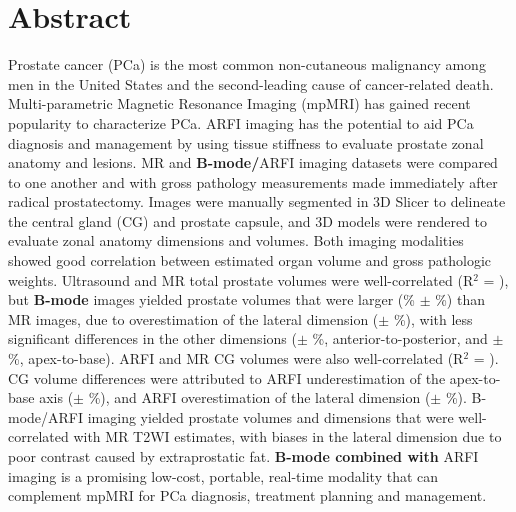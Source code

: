 \section*{Abstract}
Prostate cancer (PCa) is the most common non-cutaneous malignancy among men in
the United States and the second-leading cause of cancer-related death.
Multi-parametric Magnetic Resonance Imaging (mpMRI) has gained recent
popularity to characterize PCa.  ARFI imaging has the potential to aid PCa
diagnosis and management by using tissue stiffness to evaluate prostate zonal
anatomy and lesions.  MR and \textbf{B-mode/}ARFI \invivo imaging datasets were
compared to one another and with gross pathology measurements made immediately
after radical prostatectomy.  Images were manually segmented in 3D Slicer to
delineate the central gland (CG) and prostate capsule, and 3D models were
rendered to evaluate zonal anatomy dimensions and volumes.  Both imaging
modalities showed good correlation between estimated organ volume and gross
pathologic weights.  Ultrasound and MR total prostate volumes were
well-correlated (R$^2$ = \MRarfiVolTotalRsq), but \textbf{B-mode} images
yielded prostate volumes that were larger (\MRarfiVolTotalMeanDiff\% $\pm$
\MRarfiVolTotalStdDiff\%) than MR images, due to overestimation of the lateral
dimension (\ARFImrTotalLatLatMeanPct $\pm$ \ARFImrTotalLatLatStdPct\%), with
less significant differences in the other dimensions
(\ARFImrTotalAntPostMeanPct $\pm$ \ARFImrTotalAntPostStdPct\%,
anterior-to-posterior, and \ARFImrTotalApexBaseMeanPct $\pm$
\ARFImrTotalApexBaseStdPct\%, apex-to-base).  ARFI and MR CG volumes were also
well-correlated (R$^2$ = \MRarfiVolCentralRsq).  CG volume differences were
attributed to ARFI underestimation of the apex-to-base axis
(\ARFImrCentralApexBaseMeanPct $\pm$ \ARFImrCentralApexBaseStdPct\%), and ARFI
overestimation of the lateral dimension (\ARFImrCentralLatLatMeanPct $\pm$
\ARFImrCentralLatLatStdPct\%).  B-mode/ARFI imaging yielded prostate volumes
and dimensions that were well-correlated with MR T2WI estimates, with biases in
the lateral dimension due to poor contrast caused by extraprostatic fat.
\textbf{B-mode combined with} ARFI imaging is a promising low-cost, portable,
real-time modality that can complement mpMRI for PCa diagnosis, treatment
planning and management.
